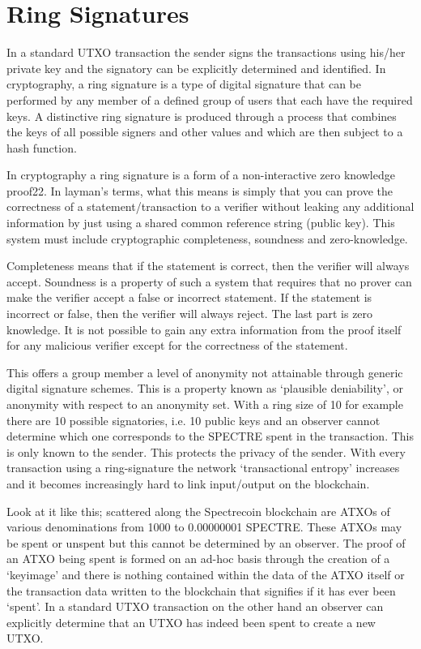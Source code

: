 \section{Ring Signatures}
In a standard UTXO transaction the sender signs the transactions using his/her
private key and the signatory can be explicitly determined and identified. In
cryptography, a ring signature is a type of digital signature that can be
performed by any member of a defined group of users that each have the required
keys. A distinctive ring signature is produced through a process that combines
the keys of all possible signers and other values and which are then subject to
a hash function.



In cryptography a ring signature is a form of a non-interactive zero knowledge
proof22. In layman’s terms, what this means is simply that you can prove the
correctness of a statement/transaction to a verifier without leaking any additional
information by just using a shared common reference string (public key).
This system must include cryptographic completeness, soundness and zero-knowledge.



Completeness means that if the statement is correct, then the verifier will
always accept. Soundness is a property of such a system that requires that
no prover can make the verifier accept a false or incorrect statement. If the
statement is incorrect or false, then the verifier will always reject. The
last part is zero knowledge. It is not possible to gain any extra information
from the proof itself for any malicious verifier except for the correctness of
the statement.



This offers a group member a level of anonymity not attainable through generic
digital signature schemes. This is a property known as ‘plausible deniability’,
or anonymity with respect to an anonymity set. With a ring size of 10 for example
there are 10 possible signatories, i.e. 10 public keys and an observer cannot
determine which one corresponds to the SPECTRE spent in the transaction. This
is only known to the sender. This protects the privacy of the sender. With every
transaction using a ring-signature the network ‘transactional entropy’ increases
and it becomes increasingly hard to link input/output on the blockchain.



Look at it like this; scattered along the Spectrecoin blockchain are ATXOs of
various denominations from 1000 to 0.00000001 SPECTRE. These ATXOs may be spent
or unspent but this cannot be determined by an observer. The proof of an ATXO
being spent is formed on an ad-hoc basis through the creation of a ‘keyimage’
and there is nothing contained within the data of the ATXO itself or the
transaction data written to the blockchain that signifies if it has ever been
‘spent’. In a standard UTXO transaction on the other hand an observer can
explicitly determine that an UTXO has indeed been spent to create a new UTXO.



